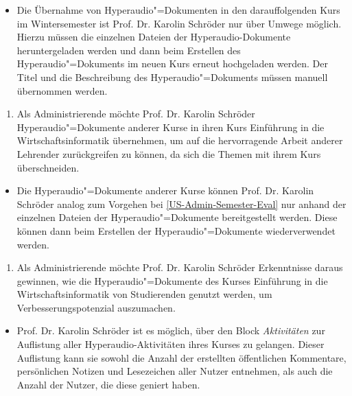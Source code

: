 \vspace{-0.1cm}
\begin{itemize}
\item[\Asterisk]
Die Übernahme von Hyperaudio"=Dokumenten in den darauffolgenden Kurs im Wintersemester ist Prof. Dr. Karolin Schröder nur über Umwege möglich. Hierzu müssen die einzelnen Dateien der Hyperaudio-Dokumente heruntergeladen werden und dann beim Erstellen des Hyperaudio"=Dokuments im neuen Kurs erneut hochgeladen werden. Der Titel und die Beschreibung des Hyperaudio"=Dokuments müssen manuell übernommen werden.
\end{itemize}
\vspace{0.25cm}
\begin{enumerate}[resume*]
\item \label{US-Admin-Kurs-Eval} Als Administrierende möchte Prof. Dr. Karolin Schröder Hyperaudio"=Dokumente anderer Kurse in ihren Kurs \glqq Einführung in die Wirtschaftsinformatik\grqq{} übernehmen, um auf die hervorragende Arbeit anderer Lehrender zurückgreifen zu können, da sich die Themen mit ihrem Kurs überschneiden.
\end{enumerate}
\vspace{-0.1cm}
\begin{itemize}
\item[\Asterisk]
Die Hyperaudio"=Dokumente anderer Kurse können Prof. Dr. Karolin Schröder analog zum Vorgehen bei \ref{US-Admin-Semester-Eval} nur anhand der einzelnen Dateien der Hyperaudio"=Dokumente bereitgestellt werden. Diese können dann beim Erstellen der Hyperaudio"=Dokumente wiederverwendet werden.
\end{itemize}
\vspace{0.25cm}
\begin{enumerate}[resume*]
\item \label{US-Admin-Statistik-Eval} Als Administrierende möchte Prof. Dr. Karolin Schröder Erkenntnisse daraus gewinnen, wie die Hyperaudio"=Dokumente des Kurses \glqq Einführung in die Wirtschaftsinformatik\grqq{} von Studierenden genutzt werden, um Verbesserungspotenzial auszumachen.
\end{enumerate}
\vspace{-0.1cm}
\begin{itemize}
\item[\Checkmark]
Prof. Dr. Karolin Schröder ist es möglich, über den Block \textit{Aktivitäten} zur Auflistung aller Hyperaudio-Aktivitäten ihres Kurses zu gelangen. Dieser Auflistung kann sie sowohl die Anzahl der erstellten öffentlichen Kommentare, persönlichen Notizen und Lesezeichen aller Nutzer entnehmen, als auch die Anzahl der Nutzer, die diese geniert haben.
\end{itemize}
